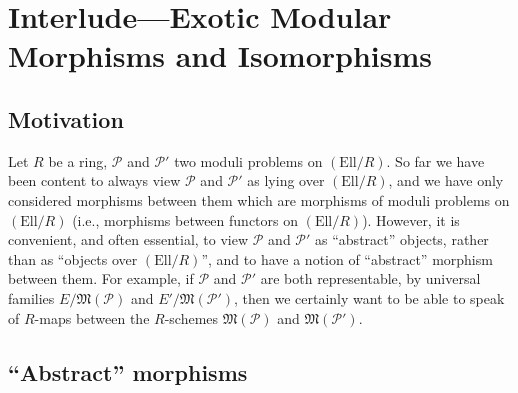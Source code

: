 \chapter{Interlude---Exotic Modular Morphisms and Isomorphisms}
\label{ch:11}

\section{Motivation}
\label{sec:11.1}

\kmitem\label{item:11.1.1}
Let $R$ be a ring, $\mathcal{P}$ and $\mathcal{P}'$ two moduli problems on $(\mathrm{Ell}/R)$. So far we have been content to always view $\mathcal{P}$ and $\mathcal{P}'$ as lying over $(\mathrm{Ell}/R)$, and we have only considered morphisms between them which are morphisms of moduli problems on $(\mathrm{Ell}/R)$ (i.e., morphisms between functors on $(\mathrm{Ell}/R)$). However, it is convenient, and often essential, to view $\mathcal{P}$ and $\mathcal{P}'$ as ``abstract'' objects, rather than as ``objects over $(\mathrm{Ell}/R)$'', and to have a notion of ``abstract'' morphism between them. For example, if $\mathcal{P}$ and $\mathcal{P}'$ are both representable, by universal families $E/\mathfrak{M}(\mathcal{P})$ and $E'/\mathfrak{M}(\mathcal{P}')$, then we certainly want to be able to speak of $R$-maps between the $R$-schemes $\mathfrak{M}(\mathcal{P})$ and $\mathfrak{M}(\mathcal{P}')$.

\section[``Abstract'' morphisms]{``Abstract'' morphisms\protect\footnotemark}
\label{sec:11.2}

